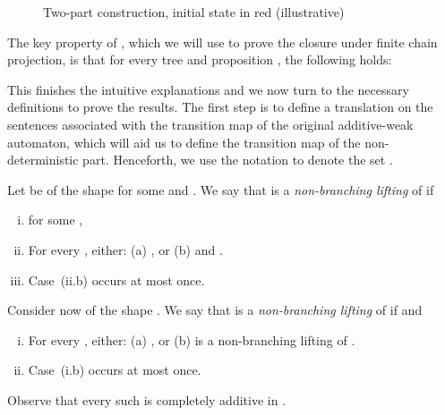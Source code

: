 \begin{figure}[h]
\caption{Two-part construction, initial state in red (illustrative)}
\label{fig:twopart}
\end{figure}
 
The key property of , which we will use to prove the closure under finite chain projection, is that for every tree  and proposition , the following holds:


This finishes the intuitive explanations and we now turn to the necessary definitions to prove the results. The first step is to define a translation on the sentences associated with the
transition map of the original additive-weak automaton, which will aid us to define the transition map of the non-deterministic part. Henceforth, we use the notation  to denote the set .

\begin{definition}\label{def:nbl}
Let  be of the shape  for some  and . We say that  is a \emph{non-branching lifting} of  if
\begin{enumerate}[(i)]
	 pt
	\item  for some ,
	\item For every , either:
			(a) , or 
			(b)  and .
	\item Case~(ii.b) occurs at most once.
\end{enumerate}
Consider now  of the shape . We say that  is a \emph{non-branching lifting} of  if  and 
\begin{enumerate}[(i)]
	 pt
\item For every , either:
(a) , or 
(b)  is a non-branching lifting of .
\item Case~(i.b) occurs at most once.
\end{enumerate}
Observe that every such  is completely additive in .
\end{definition}

